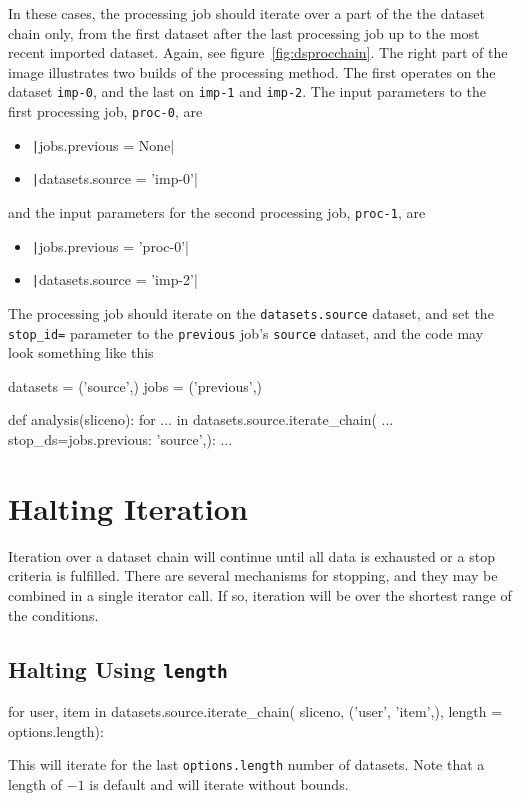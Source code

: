 In these cases, the processing job should iterate over a part of the
the dataset chain only, from the first dataset after the last
processing job up to the most recent imported dataset.  Again, see
figure~\ref{fig:dsprocchain}.  The right part of the image illustrates
two builds of the processing method.  The first operates on the
dataset \texttt{imp-0}, and the last on \texttt{imp-1}
and \texttt{imp-2}.  The input parameters to the first processing
job, \texttt{proc-0}, are
\begin{itemize}
\item[] \texttt|jobs.previous = None|
\item[] \texttt|datasets.source = 'imp-0'|
\end{itemize}
and the input parameters for the second processing
job, \texttt{proc-1}, are
\begin{itemize}
\item[] \texttt|jobs.previous = 'proc-0'|
\item[] \texttt|datasets.source = 'imp-2'|
\end{itemize}

The processing job should iterate on the \texttt{datasets.source}
dataset, and set the \texttt{stop\_id=} parameter to
the \texttt{previous} job's \texttt{source} dataset, and the code may
look something like this
\begin{python}
datasets = ('source',)
jobs = ('previous',)

def analysis(sliceno):
    for ... in datasets.source.iterate_chain(
            ...
            stop_ds={jobs.previous: 'source',}):
    ...
\end{python}











\section{Halting Iteration}

Iteration over a dataset chain will continue until all data is
exhausted or a stop criteria is fulfilled.  There are several
mechanisms for stopping, and they may be combined in a single iterator
call.  If so, iteration will be over the shortest range of the
conditions.

\subsection{Halting Using \texttt{length}}
\begin{python}
for user, item in datasets.source.iterate_chain(
                       sliceno, ('user', 'item',),
                       length = options.length):
\end{python}
This will iterate for the last \texttt{options.length} number of
datasets.  Note that a length of $-1$ is default and will iterate
without bounds.


